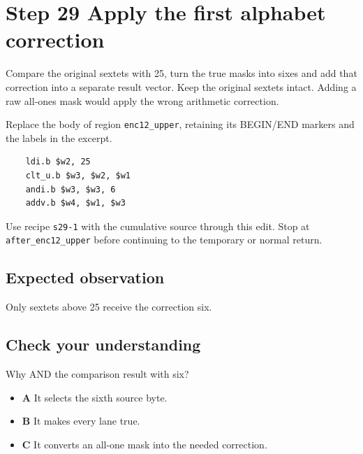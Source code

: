 \section{Step 29 Apply the first alphabet correction}\label{base64-s29}

Compare the original sextets with 25, turn the true masks into sixes and add that correction into a separate result vector. Keep the original sextets intact. Adding a raw all-ones mask would apply the wrong arithmetic correction.

Replace the body of region \texttt{enc12\_upper}, retaining its BEGIN/END markers and the labels in the excerpt.

\begin{verbatim}
    ldi.b $w2, 25
    clt_u.b $w3, $w2, $w1
    andi.b $w3, $w3, 6
    addv.b $w4, $w1, $w3
\end{verbatim}

Use recipe \texttt{s29-1} with the cumulative source through this edit. Stop at \texttt{after\_enc12\_upper} before continuing to the temporary or normal return.

\subsection{Expected observation}
Only sextets above 25 receive the correction six.

\subsection{Check your understanding}
Why AND the comparison result with six?

\begin{itemize}
  \item \textbf{A} It selects the sixth source byte.
  \item \textbf{B} It makes every lane true.
  \item \textbf{C} It converts an all-one mask into the needed correction.
\end{itemize}
